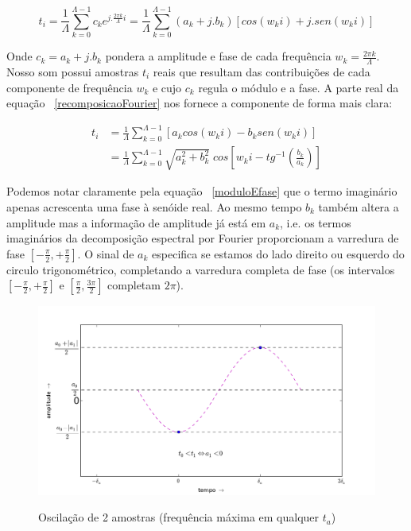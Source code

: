  
\begin{equation}\label{recomposicaoFourier}
t_i = \frac{1}{\Lambda}\sum_{k=0}^{\Lambda-1}c_ke^{j . \frac{2\pi k}{\Lambda} i } = \frac{1}{\Lambda}\sum_{k=0}^{\Lambda-1}(a_k+ j . b_k)\left[cos(w_k i) +j . sen(w_k i)\right]
\end{equation}

Onde $c_k = a_k + j . b_k$ pondera a amplitude e fase de cada frequência $w_k=\frac{2\pi k}{\Lambda}$. Nosso som possui amostras $t_i$ reais que resultam das contribuições de cada componente de frequência $w_k$ e cujo $c_k$ regula o módulo e a fase. A parte real da equação ~\ref{recomposicaoFourier} nos fornece a componente de forma mais clara:

\begin{equation}\label{moduloEfase}
\begin{split}
t_i& = \frac{1}{\Lambda}\sum_{k=0}^{\Lambda-1}\left[a_k cos(w_k i) -b_k sen(w_k i)\right] \\
   & = \frac{1}{\Lambda}\sum_{k=0}^{\Lambda-1}\sqrt{a_k^2 + b_k^2} \; cos\left[w_k i - tg^{-1}\left(\frac{b_k}{a_k}\right)\right]
\end{split}
\end{equation}

Podemos notar claramente pela equação ~\ref{moduloEfase} que o termo imaginário apenas acrescenta uma fase à senóide real. Ao mesmo tempo $b_k$ também altera a amplitude mas a informação de amplitude já está em $a_k$, i.e. os termos imaginários da decomposição espectral por Fourier proporcionam a varredura de fase
 $[-\frac{\pi}{2},+\frac{\pi}{2}]$. O sinal de $a_k$ especifica se estamos do lado direito ou esquerdo do circulo trigonométrico, completando a varredura completa de fase (os intervalos $[-\frac{\pi}{2},+\frac{\pi}{2}]$ e $[\frac{\pi}{2},\frac{3\pi}{2}]$ completam $2\pi$).


\begin{figure}[h!]
    \centering
    \caption{Oscilação de 2 amostras (frequência máxima em qualquer $t_a$)}
        \includegraphics[width=\textwidth]{figuras/amostras2c_}
        \label{fig:amostras2}
\end{figure}

